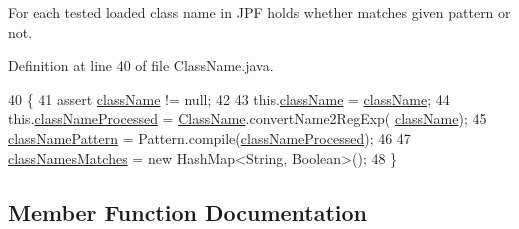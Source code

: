 For each tested loaded class name in J\+PF holds whether matches given pattern or not. 



Definition at line 40 of file Class\+Name.\+java.


\begin{DoxyCode}
40                                      \{
41     assert \hyperlink{classgov_1_1nasa_1_1jpf_1_1inspector_1_1utils_1_1expressions_1_1_class_name_a9913d2709a2450faa2937fc63b3ee977}{className} != null;
42 
43     this.\hyperlink{classgov_1_1nasa_1_1jpf_1_1inspector_1_1utils_1_1expressions_1_1_class_name_a9913d2709a2450faa2937fc63b3ee977}{className} = \hyperlink{classgov_1_1nasa_1_1jpf_1_1inspector_1_1utils_1_1expressions_1_1_class_name_a9913d2709a2450faa2937fc63b3ee977}{className};
44     this.\hyperlink{classgov_1_1nasa_1_1jpf_1_1inspector_1_1utils_1_1expressions_1_1_class_name_a53983b6735522080904ee2ff87dd354e}{classNameProcessed} = \hyperlink{classgov_1_1nasa_1_1jpf_1_1inspector_1_1utils_1_1expressions_1_1_class_name_aea0892ef2da7ab653db00fc41fa882a8}{ClassName}.convertName2RegExp(
      \hyperlink{classgov_1_1nasa_1_1jpf_1_1inspector_1_1utils_1_1expressions_1_1_class_name_a9913d2709a2450faa2937fc63b3ee977}{className});
45     \hyperlink{classgov_1_1nasa_1_1jpf_1_1inspector_1_1utils_1_1expressions_1_1_class_name_a06b384819c81e761bc4f1e81949ff582}{classNamePattern} = Pattern.compile(\hyperlink{classgov_1_1nasa_1_1jpf_1_1inspector_1_1utils_1_1expressions_1_1_class_name_a53983b6735522080904ee2ff87dd354e}{classNameProcessed});
46     
47     \hyperlink{classgov_1_1nasa_1_1jpf_1_1inspector_1_1utils_1_1expressions_1_1_class_name_a8374b6f39099158e2c63a4de4d1bf613}{classNamesMatches} = \textcolor{keyword}{new} HashMap<String, Boolean>();
48   \}
\end{DoxyCode}


\subsection{Member Function Documentation}
